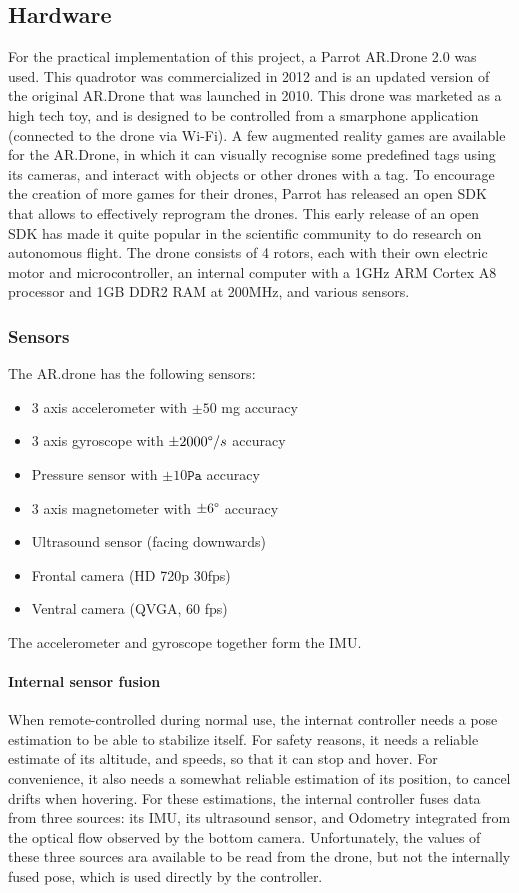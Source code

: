 \subsection{Hardware}
For the practical implementation of this project, a Parrot AR.Drone 2.0 was used. This quadrotor was commercialized in 2012 and is an updated version of the original AR.Drone that was launched in 2010. This drone was marketed as a high tech toy, and is designed to be controlled from a smarphone application (connected to the drone via Wi-Fi). A few augmented reality games are available for the AR.Drone, in which it can visually recognise some predefined tags using its cameras, and interact with objects or other drones with a tag. To encourage the creation of more games for their drones, Parrot has released an open SDK that allows to effectively reprogram the drones. This early release of an open SDK has made it quite popular in the scientific community to do research on autonomous flight. The drone consists of 4 rotors, each with their own electric motor and microcontroller, an internal computer with a 1GHz ARM Cortex A8 processor and 1GB DDR2 RAM at 200MHz, and various sensors.

\subsubsection{Sensors}
The AR.drone has the following sensors:
\begin{itemize}
  \item 3 axis accelerometer with $\pm 50$ mg accuracy
  \item 3 axis gyroscope with $\pm 2000\degree/s$ accuracy
  \item Pressure sensor with $\pm 10 \texttt{Pa}$ accuracy
  \item 3 axis magnetometer with $\pm 6\degree$ accuracy
  \item Ultrasound sensor (facing downwards)
  \item Frontal camera (HD 720p 30fps)
  \item Ventral camera (QVGA, 60 fps)
\end{itemize}

The accelerometer and gyroscope together form the IMU.

\paragraph{Internal sensor fusion}
When remote-controlled during normal use, the internat controller needs a pose estimation to be able to stabilize itself. For safety reasons, it needs a reliable estimate of its altitude, and speeds, so that it can stop and hover. For convenience, it also needs a somewhat reliable estimation of its position, to cancel drifts when hovering. For these estimations, the internal controller fuses data from three sources: its IMU, its ultrasound sensor, and Odometry integrated from the optical flow observed by the bottom camera. Unfortunately, the values of these three sources ara available to be read from the drone, but not the internally fused pose, which is used directly by the controller.

